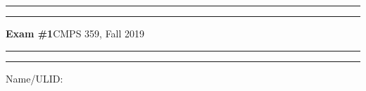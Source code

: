 \documentclass[11pt]{article}
\newcommand{\term}{Fall 2019}
\def\exam{Exam \#1}
\def\course{CMPS 359, \term}
\begin{document}
\vspace{-2cm}

\hrule
\smallskip

\noindent
\rule[-.35mm]{\textwidth}{0.7mm}
\smallskip

\noindent
{\LARGE\textbf{\exam}\hfill \course}
\medskip

\noindent
\rule[1.05mm]{\textwidth}{0.7mm}
%
\hrule

\bigskip\bigskip\bigskip\noindent
Name/ULID:\ \dotfill\dotfill\hfill{}

%
%
%


\newenvironment{grammar}{\par\bigskip\begin{tabular}[t]{lcl}}
                        {\end{tabular}\par\bigskip\noindent}
\newenvironment{grammarM}{\par\bigskip$\begin{array}[t]{lcl}}{\end{array}$}

\newcommand{\nt}[1]{\textit{#1}}

\vspace{5mm}

\newcommand{\WARN}[1]{\setlength{\dummylen}{\fboxrule}\setlength{\fboxrule}{1pt}%
            \vspace{1ex}\noindent%
            \fbox{\begin{minipage}{.99\columnwidth}#1\end{minipage}}%
            \setlength{\fboxrule}{\dummylen}\vspace{1ex}}
\newlength{\dummylen}
\end{document}
